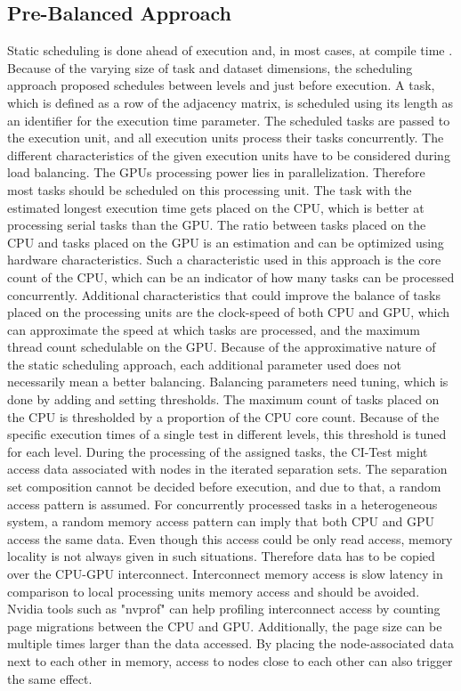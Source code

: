 \subsection{Pre-Balanced Approach}
Static scheduling is done ahead of execution and, in most cases, at compile time \cite{singhSurveyStaticScheduling2015}. Because of the varying size of task and dataset dimensions, the scheduling approach proposed schedules between levels and just before execution. A task, which is defined as a row of the adjacency matrix, is scheduled using its length as an identifier for the execution time parameter. The scheduled tasks are passed to the execution unit, and all execution units process their tasks concurrently. The different characteristics of the given execution units have to be considered during load balancing. The GPUs processing power lies in parallelization. Therefore most tasks should be scheduled on this processing unit. The task with the estimated longest execution time gets placed on the CPU, which is better at processing serial tasks than the GPU. The ratio between tasks placed on the CPU and tasks placed on the GPU is an estimation and can be optimized using hardware characteristics. Such a characteristic used in this approach is the core count of the CPU, which can be an indicator of how many tasks can be processed concurrently. Additional characteristics that could improve the balance of tasks placed on the processing units are the clock-speed of both CPU and GPU, which can approximate the speed at which tasks are processed, and the maximum thread count schedulable on the GPU. Because of the approximative nature of the static scheduling approach, each additional parameter used does not necessarily mean a better balancing. Balancing parameters need tuning, which is done by adding and setting thresholds.
The maximum count of tasks placed on the CPU is thresholded by a proportion of the CPU core count. Because of the specific execution times of a single test in different levels, this threshold is tuned for each level.
During the processing of the assigned tasks, the CI-Test might access data associated with nodes in the iterated separation sets. The separation set composition cannot be decided before execution, and due to that, a random access pattern is assumed. For concurrently processed tasks in a  heterogeneous system, a random memory access pattern can imply that both CPU and GPU access the same data. Even though this access could be only read access, memory locality is not always given in such situations. Therefore data has to be copied over the CPU-GPU interconnect. Interconnect memory access is slow latency in comparison to local processing units memory access and should be avoided. Nvidia tools such as "nvprof" can help profiling interconnect access by counting page migrations between the CPU and GPU. Additionally, the page size can be multiple times larger than the data accessed. By placing the node-associated data next to each other in memory, access to nodes close to each other can also trigger the same effect.

